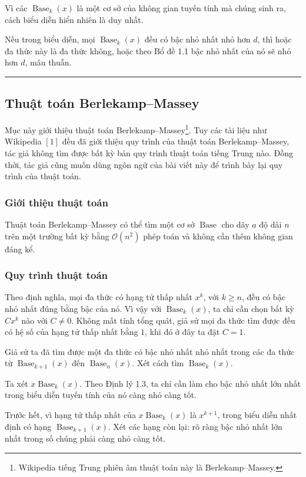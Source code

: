 \documentclass[11pt]{article}
\newcommand{\Oh}{\mathcal{O}}
\newcommand{\Base}{\operatorname{Base}}
\newcommand{\qedmark}{\hfill\rule{0.7ex}{0.7ex}}
\begin{document}
Vì các \(\Base_k(x)\) là một cơ sở của không gian tuyến tính mà chúng sinh ra,
cách biểu diễn hiển nhiên là duy nhất.

Nếu trong biểu diễn, mọi \(\Base_k(x)\) đều có bậc nhỏ nhất nhỏ hơn \(d\), thì
hoặc đa thức này là đa thức không, hoặc theo Bổ đề 1.1 bậc nhỏ nhất của nó sẽ
nhỏ hơn \(d\), mâu thuẫn. \qedmark

\subsection{Thuật toán Berlekamp--Massey}

Mục này giới thiệu thuật toán Berlekamp--Massey\footnote{Wikipedia tiếng Trung
phiên âm thuật toán này là Berlekamp--Massey.}. Tuy các tài liệu như Wikipedia
\([1]\) đều đã giới thiệu quy trình của thuật toán Berlekamp--Massey, tác giả
không tìm được bất kỳ bản quy trình thuật toán tiếng Trung nào. Đồng thời, tác
giả cũng muốn dùng ngôn ngữ của bài viết này để trình bày lại quy trình của
thuật toán.

\subsubsection{Giới thiệu thuật toán}

Thuật toán Berlekamp--Massey có thể tìm một cơ sở \(\Base\) cho dãy \(a\) độ
dài \(n\) trên một trường bất kỳ bằng \(\Oh(n^2)\) phép toán và không cần thêm
không gian đáng kể.

\subsubsection{Quy trình thuật toán}

Theo định nghĩa, mọi đa thức có hạng tử thấp nhất \(x^k\), với \(k\ge n\), đều
có bậc nhỏ nhất đúng bằng bậc của nó. Vì vậy với \(\Base_k(x)\), ta chỉ cần
chọn bất kỳ \(Cx^k\) nào với \(C\ne 0\). Không mất tính tổng quát, giả sử mọi
đa thức tìm được đều có hệ số của hạng tử thấp nhất bằng \(1\), khi đó ở đây
ta đặt \(C=1\).

Giả sử ta đã tìm được một đa thức có bậc nhỏ nhất nhỏ nhất trong các đa thức
từ \(\Base_{k+1}(x)\) đến \(\Base_n(x)\). Xét cách tìm \(\Base_k(x)\).

Ta xét \(x\Base_k(x)\). Theo Định lý 1.3, ta chỉ cần làm cho bậc nhỏ nhất lớn
nhất trong biểu diễn tuyến tính của nó càng nhỏ càng tốt.

Trước hết, vì hạng tử thấp nhất của \(x\Base_k(x)\) là \(x^{k+1}\), trong biểu
diễn nhất định có hạng \(\Base_{k+1}(x)\). Xét các hạng còn lại: rõ ràng bậc
nhỏ nhất lớn nhất trong số chúng phải càng nhỏ càng tốt.
\end{document}
